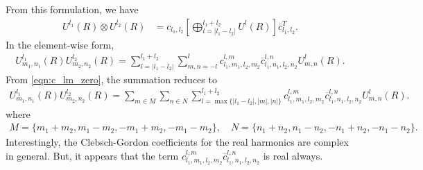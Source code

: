 \documentclass[onecolumn,11pt]{IEEEtran}
\newcommand{\bracket}[1]{\ensuremath{\left[ #1 \right]}}
\begin{document}
From this formulation, we have
\begin{align}
    U^{l_1}(R) \otimes U^{l_2}(R) & = c_{l_1,l_2} \bracket{ \bigoplus_{l=|l_1-l_2|}^{l_1+l_2} U^l(R) } \overline{c}_{l_1,l_2}^T.
\end{align}
In the element-wise form,
\begin{align}
    U^{l_1}_{m_1,n_1} (R) U^{l_2}_{m_2,n_2}(R) = \sum_{l=|l_1-l_2|}^{l_1+l_2} \sum_{m,n=-l}^l c^{l,m}_{l_1,m_1,l_2,m_2} \overline{c}^{l,n}_{l_1,n_1,l_2,n_2} U^{l}_{m,n}(R).
\end{align}
From \eqref{eqn:c_lm_zero}, the summation reduces to
\begin{align}
    U^{l_1}_{m_1,n_1} (R) U^{l_2}_{m_2,n_2}(R) =  \sum_{m\in M} \sum_{n\in N} \sum_{l=\max\{|l_1-l_2|,|m|,|n|\}}^{l_1+l_2} c^{l,m}_{l_1,m_1,l_2,m_2} \overline{c}^{l,n}_{l_1,n_1,l_2,n_2} U^{l}_{m,n}(R).
\end{align}
where
\begin{align}
    M=\{m_1+m_2,m_1-m_2,-m_1+m_2,-m_1-m_2\},\quad N=\{n_1+n_2,n_1-n_2,-n_1+n_2,-n_1-n_2\}.
\end{align}
Interestingly, the Clebsch-Gordon coefficients for the real harmonics are complex in general. 
But, it appears that the term $ c^{l,m}_{l_1,m_1,l_2,m_2} \overline{c}^{l,n}_{l_1,n_1,l_2,n_2}$ is real always.



\end{document}
